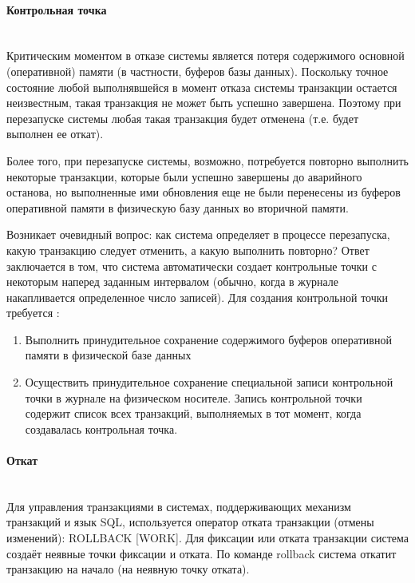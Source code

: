 \paragraph{Контрольная точка} ~\\

Критическим моментом в отказе системы является потеря содержимого основной (оперативной) памяти (в частности, буферов базы данных). Поскольку точное состояние любой выполнявшейся в момент отказа системы транзакции остается неизвестным, такая транзакция не может быть успешно завершена. Поэтому при перезапуске системы любая такая транзакция будет отменена (т.е. будет выполнен ее откат). 


Более того, при перезапуске системы, возможно, потребуется повторно выполнить некоторые транзакции, которые были успешно завершены до аварийного останова, но выполненные ими обновления еще не были перенесены из буферов оперативной памяти в физическую базу данных во вторичной памяти.


Возникает очевидный вопрос: как система определяет в процессе перезапуска, какую транзакцию следует отменить, а какую выполнить повторно? Ответ заключается в том, что система автоматически создает контрольные точки с некоторым наперед заданным интервалом (обычно, когда в журнале накапливается определенное число записей). Для создания контрольной точки требуется \autocite{Date2005}:

\begin{enumerate}
    \item Выполнить принудительное сохранение содержимого буферов оперативной памяти в физической базе данных 
    \item Осуществить принудительное сохранение специальной записи контрольной точки в журнале на физическом носителе. Запись контрольной точки содержит список всех транзакций, выполняемых в тот момент, когда создавалась контрольная точка.
\end{enumerate}

\paragraph{Откат} ~\\

Для управления транзакциями в системах, поддерживающих механизм транзакций и язык SQL, используется оператор отката транзакции (отмены изменений): ROLLBACK [WORK]. Для фиксации или отката транзакции система создаёт неявные точки фиксации и отката. По команде rollback система откатит транзакцию на начало (на неявную точку отката).

